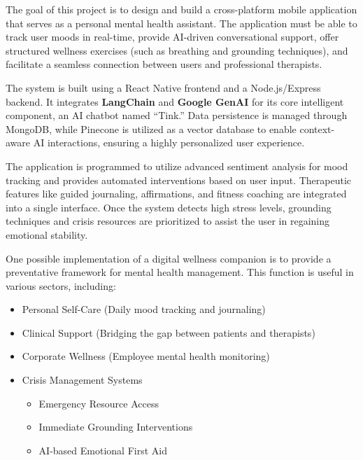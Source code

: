 \documentclass[a4paper,12pt]{report}
\begin{document}
The goal of this project is to design and build a cross-platform mobile application that serves as a personal mental health assistant. The application must be able to track user moods in real-time, provide AI-driven conversational support, offer structured wellness exercises (such as breathing and grounding techniques), and facilitate a seamless connection between users and professional therapists.

The system is built using a React Native frontend and a Node.js/Express backend. It integrates \textbf{LangChain} and \textbf{Google GenAI} for its core intelligent component, an AI chatbot named ``Tink.'' Data persistence is managed through MongoDB, while Pinecone is utilized as a vector database to enable context-aware AI interactions, ensuring a highly personalized user experience.

The application is programmed to utilize advanced sentiment analysis for mood tracking and provides automated interventions based on user input. Therapeutic features like guided journaling, affirmations, and fitness coaching are integrated into a single interface. Once the system detects high stress levels, grounding techniques and crisis resources are prioritized to assist the user in regaining emotional stability.

One possible implementation of a digital wellness companion is to provide a preventative framework for mental health management. This function is useful in various sectors, including:
\begin{itemize}
    \item Personal Self-Care (Daily mood tracking and journaling)
    \item Clinical Support (Bridging the gap between patients and therapists)
    \item Corporate Wellness (Employee mental health monitoring)
    \item Crisis Management Systems
    \begin{itemize}
        \item Emergency Resource Access
        \item Immediate Grounding Interventions
        \item AI-based Emotional First Aid
    \end{itemize}
\end{itemize}


\tableofcontents
\listoffigures
\listoftables
\end{document}
